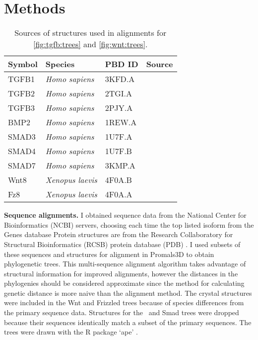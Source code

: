\section{Methods}
\label{pathways:methods}


    \begin{table}[!bt]
    \centering
	\footnotesize
    \caption[List of crystal structures used in phylogenetic trees.]
    { Sources of structures used in
    alignments for \autoref{fig:tgfb:trees} and
	\autoref{fig:wnt:trees}. }
    \label{table:pathways:methods:ligandStruct}
    \begin{tabular}{lllc}
    \hline
    Symbol  & Species & PBD ID & Source \\
    \hline
    TGFB1 &  \textit{Homo sapiens}   & 3KFD.A  & \cite{Radaev2010}  \\
    TGFB2 &  \textit{Homo sapiens}   & 2TGI.A  & \cite{Daopin1992}  \\
    TGFB3 &  \textit{Homo sapiens}   & 2PJY.A  & \cite{Groppe2008}  \\
    BMP2  &  \textit{Homo sapiens}   & 1REW.A  & \cite{Keller2004}  \\
	SMAD3 &  \textit{Homo sapiens}   & 1U7F.A  & \cite{Chacko2004}  \\
	SMAD4 &  \textit{Homo sapiens}   & 1U7F.B  & \cite{Chacko2004}  \\
	SMAD7 &  \textit{Homo sapiens}   & 3KMP.A  & \cite{BabuRajendran2010}  \\
	Wnt8  &  \textit{Xenopus laevis} & 4F0A.B  & \cite{Janda2012} \\
	Fz8   &  \textit{Xenopus laevis} & 4F0A.A  & \cite{Janda2012} \\
    \hline
    \end{tabular}
    \end{table}
    

\textbf{Sequence alignments.}
I obtained sequence data from the National Center for Bioinformatics (NCBI)
servers, choosing each time
the top listed isoform from the Genes database
Protein structures are from the
Research Collaboratory for Structural Bioinformatics (RCSB)
protein database (PDB) .
I used subsets of these sequences and structures for alignment in
Promals3D \cite{Pei2008} to obtain phylogenetic trees.
This multi-sequence alignment algorithm takes advantage of
structural information for improved alignments, however the
distances in the phylogenies should be considered approximate since the method
for calculating genetic distance is more naive than the alignment method.
The crystal structures were included in the Wnt and Frizzled trees
because of species differences from the primary sequence data.
Structures for the \tgfbsf\ and Smad trees were dropped because
their sequences identically match a subset of the primary sequences.
The trees were drawn with the R package `ape' \cite{Paradis2004}.


